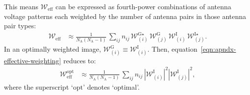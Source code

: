 \documentclass[a4paper,fleqn,usenatbib]{mnras}
\newcommand{\Nant}{N_\textrm{A}}
\begin{document}
This means $\mathcal{W}_\textrm{eff}$ can be expressed as fourth-power combinations of antenna voltage patterns each weighted by the number of antenna pairs in those antenna pair types:
\begin{align}
  \mathcal{W}_\textrm{eff} &\approx \frac{1}{\Nant(\Nant-1)}\,\sum_{ij}n_{ij}\,\mathcal{W}^{\textrm{G}\star}_{(i)}\,\mathcal{W}^\textrm{G}_{(j)}\,\mathcal{W}^\textrm{I}_{(i)}\,\mathcal{W}^{\textrm{I}\star}_{(j)}.
\end{align}
In an optimally weighted image, $\mathcal{W}^\textrm{G}_{(i)} \equiv \mathcal{W}^\textrm{I}_{(i)}$. Then, equation~\ref{eqn:apndx-effective-weighting} reduces to:
\begin{align}\label{eqn:apndx-effective-weighting-optimal}
  \mathcal{W}_\textrm{eff}^\textrm{opt} &\approx \frac{1}{\Nant(\Nant-1)}\,\sum_{ij} n_{ij}\,\left|\mathcal{W}^\textrm{I}_{(i)}\right|^2\left|\mathcal{W}^\textrm{I}_{(j)}\right|^2,
\end{align}
where the superscript `$\textrm{opt}$' denotes `optimal'.





\bsp	%
\label{lastpage}
\end{document}
